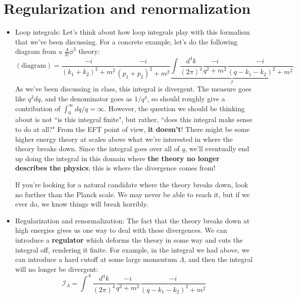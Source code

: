\documentclass[12pt, oneside]{article}   	%
\theoremstyle{definition}
\begin{document}
\section*{Regularization and renormalization}

\begin{itemize}
	
	\item Loop integrals: Let's think about how loop integrals play with this formalism that we've been discussing. For a concrete example, let's do the following diagram from a $\frac{A}{3!}\phi^3$ theory:
	\begin{equation}
		(\mathrm{diagram}) = \frac{-i}{(k_1 + k_2)^2 + m^2} \frac{-i}{(p_1 + p_2)^2 + m^2} \underbrace{\int \frac{d^4 k}{(2\pi)^4} \frac{-i}{q^2 + m^2} \frac{-i}{(q - k_1 - k_2)^2 + m^2}}_{\mathcal I}.
	\end{equation}
	As we've been discussing in class, this integral is divergent. The measure goes like $q^3 dq$, and the denominator goes as $1 / q^4$, so should roughly give a contribution of $\int_0^\infty dq / q = \infty$. However, the question we should be thinking about is not ``is this integral finite", but rather, ``does this integral make sense to do at all?" From the EFT point of view, \textbf{it doesn't}! There might be some higher energy theory at scales above what we're interested in where the theory breaks down. Since the integral goes over all of $q$, we'll eventually end up doing the integral in this domain where \textbf{the theory no longer describes the physics}; this is where the divergence comes from!
	
	If you're looking for a natural candidate where the theory breaks down, look no further than the Planck scale. We may never be able to reach it, but if we ever do, we know things will break horribly.
	
	\item Regularization and renormalization: The fact that the theory breaks down at high energies gives us one way to deal with these divergences. We can introduce a \textbf{regulator} which deforms the theory in some way and cuts the integral off, rendering it finite. For example, in the integral we had above, we can introduce a hard cutoff at some large momentum $\Lambda$, and then the integral will no longer be divergent:
	\begin{equation}
		\mathcal I_\Lambda = \int^\Lambda \frac{d^4 k}{(2\pi)^4} \frac{-i}{q^2 + m^2} \frac{-i}{(q - k_1 - k_2)^2 + m^2}
	\end{equation}
	

\end{itemize}
\end{document}
